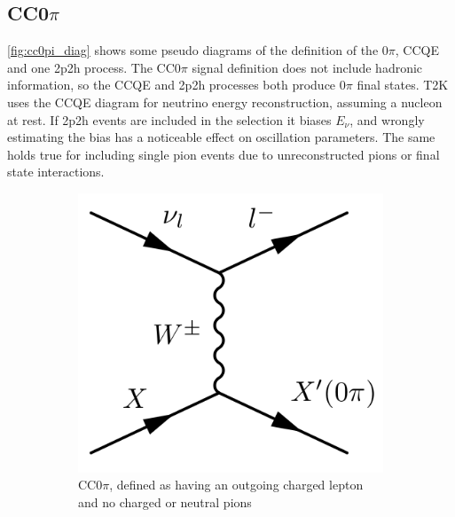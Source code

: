 \subsection{CC0$\pi$}
\autoref{fig:cc0pi_diag} shows some pseudo diagrams of the definition of the 0$\pi$, CCQE and one 2p2h process. The CC0$\pi$ signal definition does not include hadronic information, so the CCQE and 2p2h processes both produce 0$\pi$ final states. T2K uses the CCQE diagram for neutrino energy reconstruction, assuming a nucleon at rest. If 2p2h events are included in the selection it biases $E_\nu$, and wrongly estimating the bias has a noticeable effect on oscillation parameters. The same holds true for including single pion events due to unreconstructed pions or final state interactions.
\begin{figure}[h]
	\centering
	\begin{subfigure}[t]{0.32\textwidth}
		\includegraphics[width=\textwidth, trim={0mm 0mm 0mm 0mm}, clip,page=1]{figures/niwg/diagrams/CC0pi}
		\caption{CC0$\pi$, defined as having an outgoing charged lepton and no charged or neutral pions}
	\end{subfigure}
	\begin{subfigure}[t]{0.32\textwidth}

\end{subfigure}
\end{figure}
